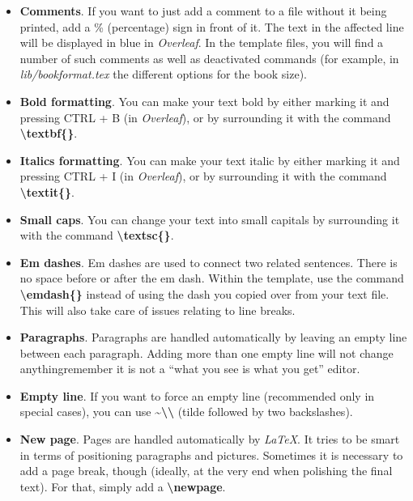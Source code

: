 \begin{itemize}

\item \textbf{Comments}. If you want to just add a comment to a file without it being printed, add a \% (percentage) sign in front of it. The text in the affected line will be displayed in blue in \textit{Overleaf}. In the template files, you will find a number of such comments as well as deactivated commands (for example, in \textit{lib/bookformat.tex} the different options for the book size).

\item \textbf{Bold formatting}. You can make your text bold by either marking it and pressing CTRL + B (in \textit{Overleaf}), or by surrounding it with the command \textbf{\textbackslash textbf\{\}}.

\item \textbf{Italics formatting}. You can make your text italic by either marking it and pressing CTRL + I (in \textit{Overleaf}), or by surrounding it with the command \textbf{\textbackslash textit\{\}}.

\item \textbf{Small caps}. You can change your text into small capitals by surrounding it with the command \textbf{\textbackslash textsc\{\}}.

\item \textbf{Em dashes}. Em dashes are used to connect two related sentences. There is no space before or after the em dash. Within the template, use the command \textbf{\textbackslash emdash\{\}} instead of using the dash you copied over from your text file. This will also take care of issues relating to line breaks.

\item \textbf{Paragraphs}. Paragraphs are handled automatically by leaving an empty line between each paragraph. Adding more than one empty line will not change anything\emdash{}remember it is not a ``what you see is what you get'' editor.

\item \textbf{Empty line}. If you want to force an empty line (recommended only in special cases), you can use \textbf{\~{}\textbackslash\textbackslash} (tilde followed by two backslashes).

\item \textbf{New page}. Pages are handled automatically by \textit{LaTeX}. It tries to be smart in terms of positioning paragraphs and pictures. Sometimes it is necessary to add a page break, though (ideally, at the very end when polishing the final text). For that, simply add a \textbf{\textbackslash newpage}.


\end{itemize}
